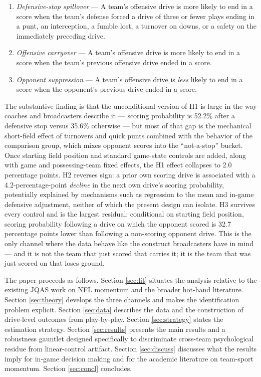 \documentclass[11pt]{article}
\begin{document}
\begin{enumerate}
    \item[\textbf{H1.}] \emph{Defensive-stop spillover} --- A team's offensive
    drive is more likely to end in a score when the team's defense forced a
    drive of three or fewer plays ending in a punt, an interception, a fumble
    lost, a turnover on downs, or a safety on the immediately preceding drive.
    \item[\textbf{H2.}] \emph{Offensive carryover} --- A team's offensive drive
    is more likely to end in a score when the team's previous offensive drive
    ended in a score.
    \item[\textbf{H3.}] \emph{Opponent suppression} --- A team's offensive
    drive is \emph{less} likely to end in a score when the opponent's previous
    drive ended in a score.
\end{enumerate}

The substantive finding is that the unconditional version of H1 is large in
the way coaches and broadcasters describe it --- scoring probability is
52.2\% after a defensive stop versus 35.6\% otherwise --- but most of that gap
is the mechanical short-field effect of turnovers and quick punts combined
with the behavior of the comparison group, which mixes opponent scores into
the ``not-a-stop'' bucket. Once starting field position and standard game-state
controls are added, along with game and possessing-team fixed effects, the
H1 effect collapses to 2.0 percentage points. H2 reverses sign: a prior own
scoring drive is associated with a 4.2-percentage-point \emph{decline} in the
next own drive's scoring probability, potentially explained by mechanisms such
as regression to the mean and in-game defensive adjustment, neither of which
the present design can isolate. H3 survives every control and is the largest
residual: conditional on starting field position, scoring probability
following a drive on which the opponent scored is 32.7 percentage points lower
than following a non-scoring opponent drive. This is the only channel where
the data behave like the construct broadcasters have in mind --- and it is
not the team that just scored that carries it; it is the team that was just
scored on that loses ground.

The paper proceeds as follows. Section \ref{sec:lit} situates the analysis
relative to the existing JQAS work on NFL momentum and the broader hot-hand
literature. Section \ref{sec:theory} develops the three channels and makes
the identification problem explicit. Section \ref{sec:data} describes the
data and the construction of drive-level outcomes from play-by-play.
Section \ref{sec:strategy} states the estimation strategy. Section
\ref{sec:results} presents the main results and a robustness gauntlet
designed specifically to discriminate cross-team psychological residue from
linear-control artifact. Section \ref{sec:discuss} discusses what the results
imply for in-game decision making and for the academic literature on
team-sport momentum. Section \ref{sec:concl} concludes.
\end{document}
